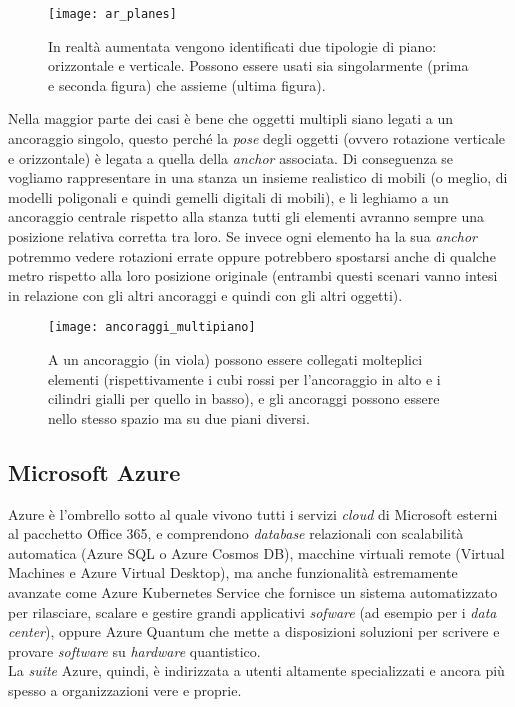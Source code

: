 \begin{figure}[H]
  \centering
  \texttt{[image: ar\_planes]}
  \caption[Piani in realtà aumentata]{In realtà aumentata vengono identificati due tipologie di piano: orizzontale e verticale. Possono essere usati sia singolarmente (prima e seconda figura) che assieme (ultima figura).}
\end{figure}

Nella maggior parte dei casi è bene che oggetti multipli siano legati a un ancoraggio singolo, questo perché la \textit{pose} degli oggetti (ovvero rotazione verticale e orizzontale) è legata a quella della \textit{anchor} associata. Di conseguenza se vogliamo rappresentare in una stanza un insieme realistico di mobili (o meglio, di modelli poligonali e quindi gemelli digitali di mobili), e li leghiamo a un ancoraggio centrale rispetto alla stanza tutti gli elementi avranno sempre una posizione relativa corretta tra loro. Se invece ogni elemento ha la sua \textit{anchor} potremmo vedere rotazioni errate oppure potrebbero spostarsi anche di qualche metro rispetto alla loro posizione originale (entrambi questi scenari vanno intesi in relazione con gli altri ancoraggi e quindi con gli altri oggetti).

\begin{figure}[H]
  \centering
  \texttt{[image: ancoraggi\_multipiano]}
  \caption[Ancoraggi singoli per multipli elementi]{A un ancoraggio (in viola) possono essere collegati molteplici elementi (rispettivamente i cubi rossi per l'ancoraggio in alto e i cilindri gialli per quello in basso), e gli ancoraggi possono essere nello stesso spazio ma su due piani diversi.}
\end{figure}

\subsection{Microsoft Azure}
\label{subsec:azure}
Azure è l'ombrello sotto al quale vivono tutti i servizi \textit{cloud} di Microsoft esterni al pacchetto Office 365, e comprendono \textit{database} relazionali con scalabilità automatica (Azure SQL o Azure Cosmos DB), macchine virtuali remote (Virtual Machines e Azure Virtual Desktop), ma anche funzionalità estremamente avanzate come Azure Kubernetes Service che fornisce un sistema automatizzato per rilasciare, scalare e gestire grandi applicativi \textit{sofware} (ad esempio per i \textit{data center}), oppure Azure Quantum che mette a disposizioni soluzioni per scrivere e provare \textit{software} su \textit{hardware} quantistico.\\
La \textit{suite} Azure, quindi, è indirizzata a utenti altamente specializzati e ancora più spesso a organizzazioni vere e proprie.

